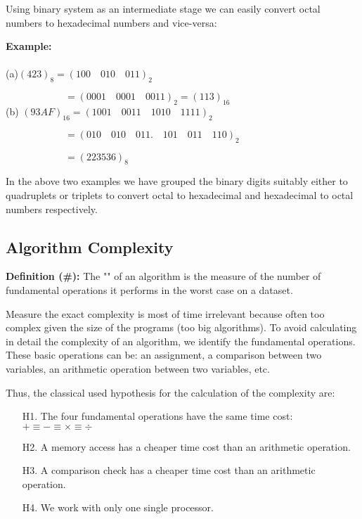	Using binary system as an intermediate stage we can easily convert octal numbers to hexadecimal numbers and vice-versa:
	\begin{tcolorbox}[colframe=black,colback=white,sharp corners]
	\textbf{{\Large {}}Example:}\\\\
	(a)$(423)_{8}=(100\quad 010\quad 011)_{2}$
	
	$\qquad\qquad\qquad=(0001\quad 0001\quad 0011)_{2}=(113)_{16}$\\
	
	(b) $(93AF)_{16}=(1001\quad0011\quad1010\quad1111)_{2}$
	
	$\qquad\qquad\qquad=(010\quad010\quad011.\quad101\quad011\quad110)_{2}$
	
	$\qquad\qquad\qquad=(223536)_{8}$
	\end{tcolorbox}
	
	In the above two examples we have grouped the binary digits suitably either to quadruplets or triplets to convert octal to hexadecimal and hexadecimal to octal numbers respectively.



	\pagebreak	
	\subsection{Algorithm Complexity}\label{algorithm complexity}

\textbf{Definition (\#\mydef):} The "" of an algorithm is the measure of the number of fundamental operations it performs in the worst case on a dataset.

Measure the exact complexity is most of time irrelevant because often too complex given the size of the programs (too big algorithms). To avoid calculating in detail the complexity of an algorithm, we identify the fundamental operations. These basic operations can be: an assignment, a comparison between two variables, an arithmetic operation between two variables, etc.

Thus, the classical used hypothesis for the calculation of the complexity are:

	\begin{enumerate}
		\item[H1.] The four fundamental operations have the same time cost: $+ \equiv - \equiv \times \equiv \div$
		\item[H2.] A memory access has a cheaper time cost than an arithmetic operation.
		\item[H3.] A comparison check has a cheaper time cost than an arithmetic operation.
		\item[H4.] We work with only one single processor.
	\end{enumerate}
	
